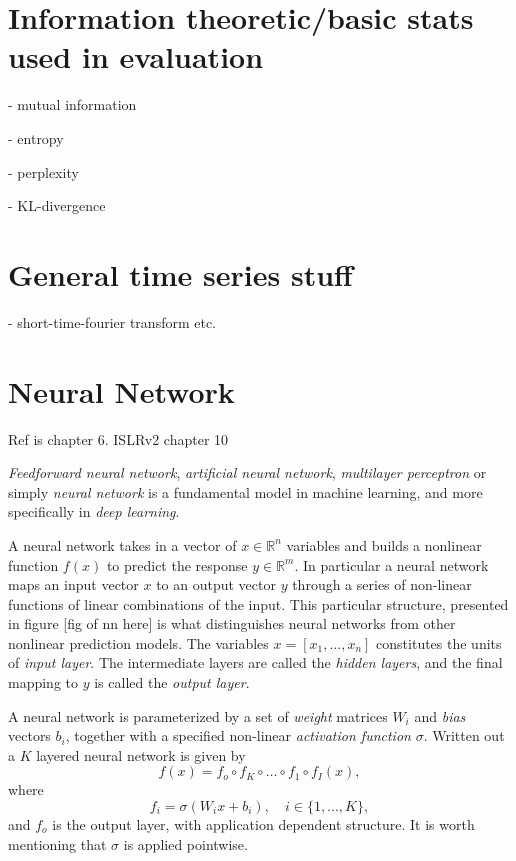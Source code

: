 \documentclass[../../thesis.tex]{subfiles}
\begin{document}


\section{Information theoretic/basic stats used in evaluation}

- mutual information

- entropy

- perplexity

- KL-divergence

\section{General time series stuff}
- short-time-fourier transform etc.

\section{Neural Network}

Ref is \cite{deeplearningbook} chapter 6. ISLRv2 chapter 10

\textit{Feedforward neural network}, \textit{artificial neural network}, \textit{multilayer perceptron} or simply \textit{neural network} is a fundamental model in machine learning, and more specifically in \textit{deep learning}. 


A neural network takes in a vector of $x \in \mathbb{R}^n$ variables and builds a nonlinear function $f(x)$ to predict the response $y\in \mathbb{R}^m$. In particular a neural network maps an input vector $x$ to an output vector $y$ through a series of non-linear functions of linear combinations of the input. This particular structure, presented in figure [fig of nn here] is what distinguishes neural networks from other nonlinear prediction models. The variables $x = [x_1,...,x_n]$ constitutes the units of \textit{input layer}. The intermediate layers are called the \textit{hidden layers}, and the final mapping to $y$ is called the \textit{output layer}.

A neural network is parameterized by a set of \textit{weight} matrices $W_i$ and \textit{bias} vectors $b_i$, together with a specified non-linear \textit{activation function} $\sigma$. Written out a $K$ layered neural network is given by 
\[ 
f(x) = f_o \circ f_K \circ \ldots \circ f_1 \circ f_I(x),
\]
where 
$$f_i = \sigma(W_ix+b_i), \quad i \in \{1,...,K\},$$ 
and $f_o$ is the output layer, with application dependent structure. It is worth mentioning that $\sigma$ is applied pointwise.
\end{document}
